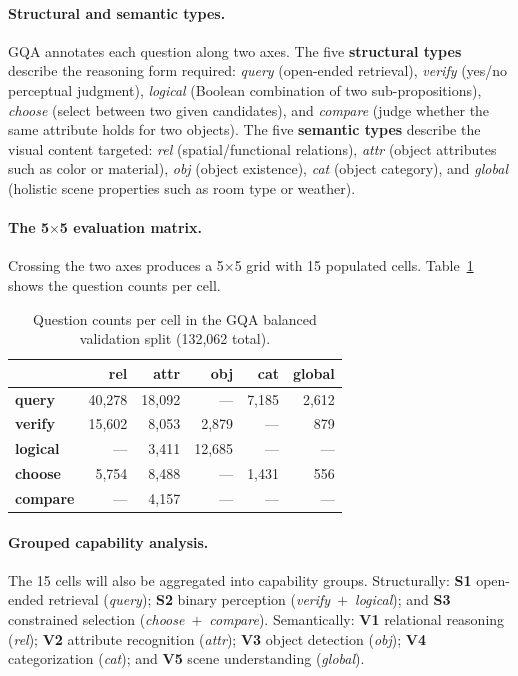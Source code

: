 \documentclass[11pt]{article}
\begin{document}
\paragraph{Structural and semantic types.} GQA annotates each question along two axes. The five \textbf{structural types} describe the reasoning form required: \textit{query} (open-ended retrieval), \textit{verify} (yes/no perceptual judgment), \textit{logical} (Boolean combination of two sub-propositions), \textit{choose} (select between two given candidates), and \textit{compare} (judge whether the same attribute holds for two objects). The five \textbf{semantic types} describe the visual content targeted: \textit{rel} (spatial/functional relations), \textit{attr} (object attributes such as color or material), \textit{obj} (object existence), \textit{cat} (object category), and \textit{global} (holistic scene properties such as room type or weather).

\paragraph{The 5$\times$5 evaluation matrix.} Crossing the two axes produces a 5$\times$5 grid with 15 populated cells. Table~\ref{tab:matrix} shows the question counts per cell.

\begin{table}[h]
\centering
\small
\begin{tabular}{lrrrrr}
\toprule
 & \textbf{rel} & \textbf{attr} & \textbf{obj} & \textbf{cat} & \textbf{global} \\
\midrule
\textbf{query}   & 40,278 & 18,092 & ---    & 7,185 & 2,612 \\
\textbf{verify}  & 15,602 &  8,053 & 2,879  & ---   &   879 \\
\textbf{logical} &    --- &  3,411 & 12,685 & ---   &   --- \\
\textbf{choose}  &  5,754 &  8,488 & ---    & 1,431 &   556 \\
\textbf{compare} &    --- &  4,157 & ---    & ---   &   --- \\
\bottomrule
\end{tabular}
\caption{Question counts per cell in the GQA balanced validation split (132,062 total).}
\label{tab:matrix}
\end{table}

\paragraph{Grouped capability analysis.} The 15 cells will also be aggregated into capability groups. Structurally: \textbf{S1} open-ended retrieval (\textit{query}); \textbf{S2} binary perception (\textit{verify}~$+$~\textit{logical}); and \textbf{S3} constrained selection (\textit{choose}~$+$~\textit{compare}). Semantically: \textbf{V1} relational reasoning (\textit{rel}); \textbf{V2} attribute recognition (\textit{attr}); \textbf{V3} object detection (\textit{obj}); \textbf{V4} categorization (\textit{cat}); and \textbf{V5} scene understanding (\textit{global}).
\end{document}
